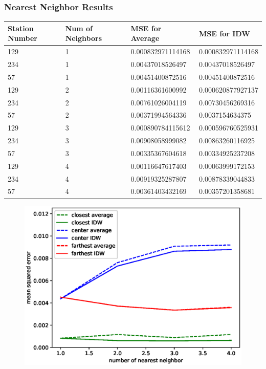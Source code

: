 \begin{frame}
\frametitle{Nearest Neighbor Results}
\centering
\footnotesize
\begin{tabular}{|l|l|l|l|}
\hline
\textbf{Station Number} & \textbf{Num of Neighbors} & \textbf{MSE for Average} &\textbf{MSE for IDW}\\
\hline
129 & 1 & 0.000832971114168 & 0.000832971114168\\
\hline
234 & 1 & 0.00437018526497 & 0.00437018526497\\
\hline
57 & 1 & 0.00451400872516 & 0.00451400872516\\
\hline
129 & 2 & 0.00116361600992 & 0.000620877927137\\
\hline
234 & 2 & 0.00761026004119 & 0.00730456269316\\
\hline
57 & 2 & 0.00371994564336 & 0.0037154634375\\
\hline
129 & 3 & 0.000890784115612 & 0.000596760525931\\
\hline
234 & 3 & 0.00908058999082 & 0.00863260116925\\
\hline
57 & 3 & 0.00335367604618 & 0.00334925237208\\
\hline
129 & 4 & 0.00116647617403 & 0.00063999172153\\
\hline
234 & 4 & 0.00919325287807 & 0.00878339044833\\
\hline
57 & 4 & 0.00361403432169 & 0.00357201358681\\
\hline
\end{tabular}
\end{frame}

\begin{frame}
\begin{figure}
\includegraphics[width=1.0\textwidth]{images/soi-nearest-distance}
\end{figure}
\end{frame}

